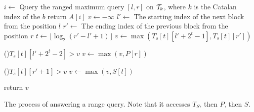 \begin{algorithm}[H]
\SetAlgoNoLine
\LinesNumbered
{}

 {
  $i \gets$ Query the ranged maximum query $[l, r]$ on ${\cal T}_{k}$, where $k$ is the Catalan index of the $b$  \;
  return $A[i]$ \;
}
$v \gets - \infty$ \;
$l' \gets$ The starting index of the next block from the position $l$ \;
$r' \gets$ The ending index of the previous block from the position $r$ \;
$t \gets \lfloor \log_2 (r' - l' + 1) \rfloor$ \;
 {
  $v \gets \max(T_s[t][l' + 2^t - 1], T_s[t][r'])$ \;
}

\If(){$T_s[t][l' + 2^t - 2] > v$} {
  $v \gets \max(v, P[r])$ \;
}

\If(){$T_s[t][r' + 1] > v$} {
  $v \gets \max(v, S[l])$ \;
}

return $v$ \;

\caption{The process of answering a range query. Note that it accesses
  $T_S$, then $P$, then $S$.}
\label{alg:rmq-access-order-2e}
\end{algorithm}
